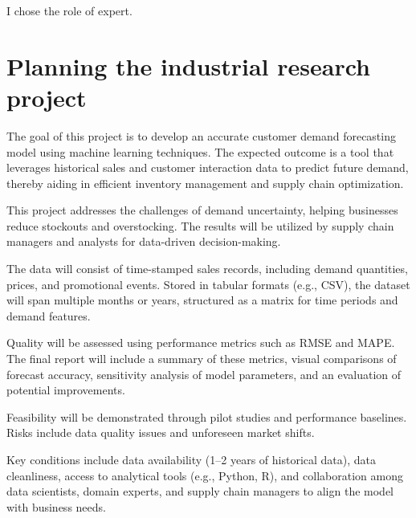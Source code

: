 \documentclass[12pt]{article}
\date{}
\begin{document}
\maketitle

I chose the role of expert.


\section{Planning the industrial research project}

The goal of this project is to develop an accurate customer demand forecasting model using machine learning techniques. The expected outcome is a tool that leverages historical sales and customer interaction data to predict future demand, thereby aiding in efficient inventory management and supply chain optimization.

This project addresses the challenges of demand uncertainty, helping businesses reduce stockouts and overstocking. The results will be utilized by supply chain managers and analysts for data-driven decision-making.

The data will consist of time-stamped sales records, including demand quantities, prices, and promotional events. Stored in tabular formats (e.g., CSV), the dataset will span multiple months or years, structured  as a matrix  for time periods and demand features.

Quality will be assessed using performance metrics such as RMSE and MAPE. The final report will include a summary of these metrics, visual comparisons of forecast accuracy, sensitivity analysis of model parameters, and an evaluation of potential improvements.

Feasibility will be demonstrated through pilot studies and performance baselines. Risks include data quality issues  and unforeseen market shifts. 

Key conditions include data availability (1–2 years of historical data), data cleanliness, access to analytical tools (e.g., Python, R), and collaboration among data scientists, domain experts, and supply chain managers to align the model with business needs.
\end{document}
